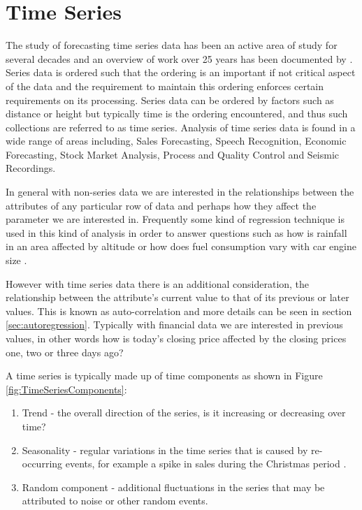 \section{Time Series}
The study of forecasting time series data has been an active area of study for several decades and an overview of work over 25 years has been documented by \cite{DeGooijer2006443}. Series data is ordered such that the ordering is an important if not critical aspect of the data and the requirement to maintain this ordering enforces certain requirements on its processing. Series data can be ordered by factors such as distance or height but typically time is the ordering encountered, and thus such collections are referred to as time series. Analysis of time series data is found in a wide range of areas including, Sales Forecasting, Speech Recognition, Economic Forecasting, Stock Market Analysis, Process and Quality Control and Seismic Recordings.

In general with non-series data we are interested in the relationships between the attributes of any particular row of data and perhaps how they affect the parameter we are interested in. Frequently some kind of regression technique is used in this kind of analysis in order to answer questions such as how is rainfall in an area affected by altitude or how does fuel consumption vary with car engine size \citep{han2011data}.

However with time series data there is an additional consideration, the relationship between the attribute's current value to that of its previous or later values. This is known as auto-correlation \citep{mills2011} and more details can be seen in section \ref{sec:autoregression}. Typically with financial data we are interested in previous values, in other words how is today's closing price affected by the closing prices one, two or three days ago?

A time series is typically made up of time components as shown in Figure \ref{fig:TimeSeriesComponents}:
\begin{enumerate}
\item Trend - the overall direction of the series, is it increasing or decreasing over time?
\item Seasonality - regular variations in the time series that is caused by re-occurring events, for example a spike in sales during the Christmas period \citep{So2014212}.
\item Random component - additional fluctuations in the series that may be attributed to noise or other random events.
\end{enumerate}

